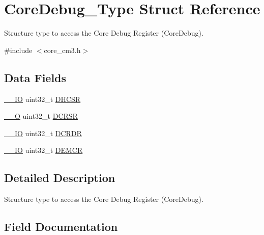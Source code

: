 \hypertarget{struct_core_debug___type}{}\section{Core\+Debug\+\_\+\+Type Struct Reference}
\label{struct_core_debug___type}


Structure type to access the Core Debug Register (Core\+Debug).  




{\ttfamily \#include $<$core\+\_\+cm3.\+h$>$}

\subsection*{Data Fields}
\begin{DoxyCompactItemize}
\item 
\mbox{\hyperlink{core__sc300_8h_aec43007d9998a0a0e01faede4133d6be}{\+\_\+\+\_\+\+IO}} uint32\+\_\+t \mbox{\hyperlink{struct_core_debug___type_a39bc5e68dc6071187fbe2348891eabfa}{D\+H\+C\+SR}}
\item 
\mbox{\hyperlink{core__sc300_8h_a7e25d9380f9ef903923964322e71f2f6}{\+\_\+\+\_\+O}} uint32\+\_\+t \mbox{\hyperlink{struct_core_debug___type_a7b49cb58573da77cc8a83a1b21262180}{D\+C\+R\+SR}}
\item 
\mbox{\hyperlink{core__sc300_8h_aec43007d9998a0a0e01faede4133d6be}{\+\_\+\+\_\+\+IO}} uint32\+\_\+t \mbox{\hyperlink{struct_core_debug___type_a5bcffe99d1d5471d5e5befbc6272ebf0}{D\+C\+R\+DR}}
\item 
\mbox{\hyperlink{core__sc300_8h_aec43007d9998a0a0e01faede4133d6be}{\+\_\+\+\_\+\+IO}} uint32\+\_\+t \mbox{\hyperlink{struct_core_debug___type_a6cdfc0a6ce3e988cc02c2d6e8107d193}{D\+E\+M\+CR}}
\end{DoxyCompactItemize}


\subsection{Detailed Description}
Structure type to access the Core Debug Register (Core\+Debug). 

\subsection{Field Documentation}
\mbox{\label{struct_core_debug___type_a5bcffe99d1d5471d5e5befbc6272ebf0}} 
